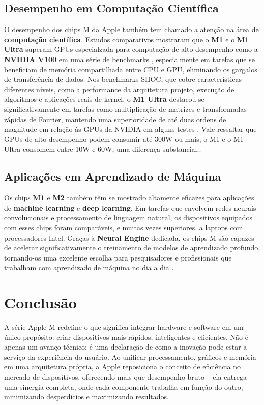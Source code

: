 \documentclass[a4paper,times,12pt]{article}
\begin{document}
\subsection{Desempenho em Computação Científica}
\hspace{+15pt}
O desempenho dos chips M da Apple também tem chamado a atenção na área de \textbf{computação científica}. Estudos comparativos mostraram que o \textbf{M1} e o \textbf{M1 Ultra} superam GPUs especialzada para computação de alto desempenho como a \textbf{NVIDIA V100} em uma série de benchmarks , especialmente em tarefas que se beneficiam de memória compartilhada entre CPU e GPU, eliminando os gargalos de transferência de dados. Nos benchmarks SHOC, que cobre características diferentes níveis, como a performance da arquitetura projeto, execução de algoritmos e aplicações reais de kernel, o \textbf{M1 Ultra} destacou-se significativamente em tarefas como multiplicação de matrizes e transformadas rápidas de Fourier, mantendo uma superioridade de até duas ordens de magnitude em relação às GPUs da NVIDIA em alguns testes \cite{apple_silicon_scientific_computing}.
Vale ressaltar que GPUs de alto desempenho podem consumir até 300W ou mais, o M1 e o M1 Ultra consomem entre 10W e 60W, uma diferença substancial.\cite{apple_silicon_scientific_computing}.

\subsection{Aplicações em Aprendizado de Máquina}
\hspace{+15pt}
Os chips \textbf{M1} e \textbf{M2} também têm se mostrado altamente eficazes para aplicações de \textbf{machine learning} e \textbf{deep learning}. Em tarefas que envolvem redes neurais convolucionais e processamento de linguagem natural, os dispositivos equipados com esses chips foram comparáveis, e muitas vezes superiores, a laptops com processadores Intel. Graças à \textbf{Neural Engine} dedicada, os chips M são capazes de acelerar significativamente o treinamento de modelos de aprendizado profundo, tornando-os uma excelente escolha para pesquisadores e profissionais que trabalham com aprendizado de máquina no dia a dia \cite{usability_ml, apple_silicon_potential}.

\section{Conclusão}
\hspace{+15pt}
A série Apple M redefine o que significa integrar hardware e software em um único propósito: criar dispositivos mais rápidos, inteligentes e eficientes. Não é apenas um avanço técnico; é uma declaração de como a inovação pode estar a serviço da experiência do usuário. Ao unificar processamento, gráficos e memória em uma arquitetura própria, a Apple reposiciona o conceito de eficiência no mercado de dispositivos, oferecendo mais que desempenho bruto – ela entrega uma sinergia completa, onde cada componente trabalha em função do outro, minimizando desperdícios e maximizando resultados.
\end{document}
